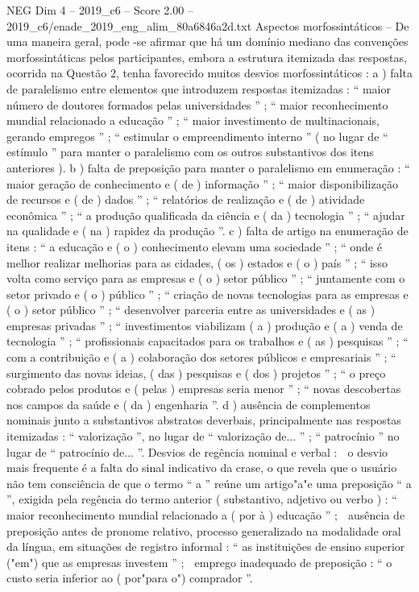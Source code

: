 \begin{textsample}{NEG Dim 4 – 2019\_c6 – Score 2.00 – 2019\_c6/enade\_2019\_eng\_alim\_80a6846a2d.txt}
Aspectos morfossintáticos – De uma maneira geral, pode -se afirmar que há um domínio mediano das convenções morfossintáticas pelos participantes, embora a estrutura itemizada das respostas, ocorrida na Questão 2, tenha favorecido muitos desvios morfossintáticos : a ) falta de paralelismo entre elementos que introduzem respostas itemizadas : “ maior número de doutores formados pelas universidades ” ; “ maior reconhecimento mundial relacionado a educação ” ; “ maior investimento de multinacionais, gerando empregos ” ; “ estimular o empreendimento interno ” ( no lugar de “ estímulo ” para manter o paralelismo com os outros substantivos dos itens anteriores ). b ) falta de preposição para manter o paralelismo em enumeração : “ maior geração de conhecimento e ( de ) informação ” ; “ maior disponibilização de recursos e ( de ) dados ” ; “ relatórios de realização e ( de ) atividade econômica ” ; “ a produção qualificada da ciência e ( da ) tecnologia ” ; “ ajudar na qualidade e ( na ) rapidez da produção ”. c ) falta de artigo na enumeração de itens : “ a educação e ( o ) conhecimento elevam uma sociedade ” ; “ onde é melhor realizar melhorias para as cidades, ( os ) estados e ( o ) país ” ; “ isso volta como serviço para as empresas e ( o ) setor público ” ; “ juntamente com o setor privado e ( o ) público ” ; “ criação de novas tecnologias para as empresas e ( o ) setor público ” ; “ desenvolver parceria entre as universidades e ( as ) empresas privadas ” ; “ investimentos viabilizam ( a ) produção e ( a ) venda de tecnologia ” ; “ profissionais capacitados para os trabalhos e ( as ) pesquisas ” ; “ com a contribuição e ( a ) colaboração dos setores públicos e empresariais ” ; “ surgimento das novas ideias, ( das ) pesquisas e ( dos ) projetos ” ; “ o preço cobrado pelos produtos e ( pelas ) empresas seria menor ” ; “ novas descobertas nos campos da saúde e ( da ) engenharia ”. d ) ausência de complementos nominais junto a substantivos abstratos deverbais, principalmente nas respostas itemizadas : “ valorização ”, no lugar de “ valorização de... ” ; “ patrocínio ” no lugar de “ patrocínio de... ”.
Desvios de regência nominal e verbal :  o desvio mais frequente é a falta do sinal indicativo da crase, o que revela que o usuário não tem consciência de que o termo “ a ” reúne um artigo"a"e uma preposição “ a ”, exigida pela regência do termo anterior ( substantivo, adjetivo ou verbo ) : “ maior reconhecimento mundial relacionado a ( por à ) educação ” ;  ausência de preposição antes de pronome relativo, processo generalizado na modalidade oral da língua, em situações de registro informal : “ as instituições de ensino superior ("em") que as empresas investem ” ;  emprego inadequado de preposição : “ o custo seria inferior ao ( por"para o") comprador ”.

\end{textsample}
